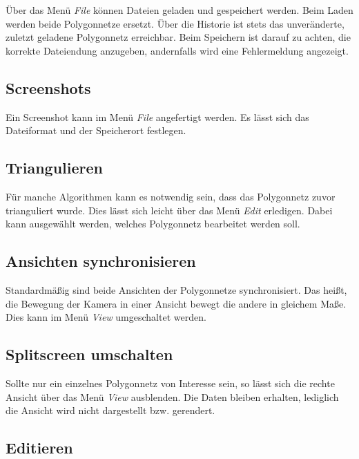 Über das Menü \emph{File} können Dateien geladen und gespeichert werden.
Beim Laden werden beide Polygonnetze ersetzt.
Über die Historie ist stets das unveränderte, zuletzt geladene Polygonnetz erreichbar.
Beim Speichern ist darauf zu achten, die korrekte Dateiendung anzugeben, andernfalls wird eine Fehlermeldung angezeigt.

\subsection{Screenshots}

Ein Screenshot kann im Menü \emph{File} angefertigt werden. 
Es lässt sich das Dateiformat und der Speicherort festlegen.

\subsection{Triangulieren}

Für manche Algorithmen kann es notwendig sein, dass das Polygonnetz zuvor trianguliert wurde.
Dies lässt sich leicht über das Menü \emph{Edit} erledigen.
Dabei kann ausgewählt werden, welches Polygonnetz bearbeitet werden soll.

\subsection{Ansichten synchronisieren}

Standardmäßig sind beide Ansichten der Polygonnetze synchronisiert.
Das heißt, die Bewegung der Kamera in einer Ansicht bewegt die andere in gleichem Maße.
Dies kann im Menü \emph{View} umgeschaltet werden.

\subsection{Splitscreen umschalten}

Sollte nur ein einzelnes Polygonnetz von Interesse sein, so lässt sich die rechte Ansicht über das Menü \emph{View} ausblenden.
Die Daten bleiben erhalten, lediglich die Ansicht wird nicht dargestellt bzw. gerendert.

\subsection{Editieren}

